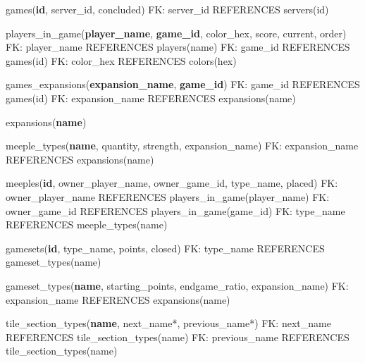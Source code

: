 games(\textbf{id}, server\_id, concluded)\newline
FK: server\_id REFERENCES servers(id)\newline

players\_in\_game(\textbf{player\_name}, \textbf{game\_id}, color\_hex, score, current, order)\newline
FK: player\_name REFERENCES players(name)\newline
FK: game\_id REFERENCES games(id)\newline
FK: color\_hex REFERENCES colors(hex)\newline

games\_expansions(\textbf{expansion\_name}, \textbf{game\_id})\newline
FK: game\_id REFERENCES games(id)\newline
FK: expansion\_name REFERENCES expansions(name)\newline

expansions(\textbf{name})\newline

meeple\_types(\textbf{name}, quantity, strength, expansion\_name)\newline
FK: expansion\_name REFERENCES expansions(name)\newline

meeples(\textbf{id}, owner\_player\_name, owner\_game\_id, type\_name, placed)\newline
FK: owner\_player\_name REFERENCES players\_in\_game(player\_name)\newline
FK: owner\_game\_id REFERENCES players\_in\_game(game\_id)\newline
FK: type\_name REFERENCES meeple\_types(name)\newline

gamesets(\textbf{id}, type\_name, points, closed)\newline
FK: type\_name REFERENCES gameset\_types(name)\newline

gameset\_types(\textbf{name}, starting\_points, endgame\_ratio, expansion\_name)\newline
FK: expansion\_name REFERENCES expansions(name)\newline

tile\_section\_types(\textbf{name}, next\_name*, previous\_name*)\newline
FK: next\_name REFERENCES tile\_section\_types(name)\newline
FK: previous\_name REFERENCES tile\_section\_types(name)\newline

